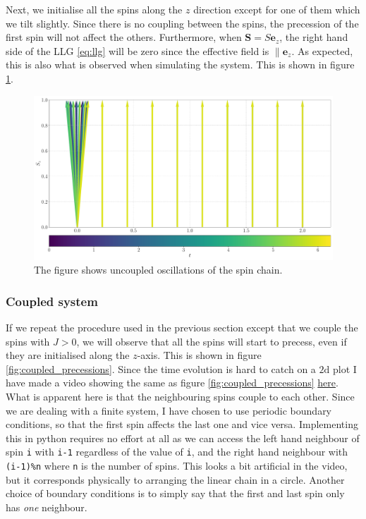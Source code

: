 Next, we initialise all the spins along the $z$ direction except for one of them which we tilt slightly. Since there is no coupling between the spins, the precession of the first spin will not affect the others. Furthermore, when $\mathbf{S} = S\mathbf{e}_z$, the right hand side of the LLG \eqref{eq:llg} will be zero since the effective field is $\parallel \mathbf{e}_z$. As expected, this is also what is observed when simulating the system. This is shown in figure \ref{fig:precessions}.

\begin{figure}[htb]
	\centering
	\includegraphics[width=\columnwidth]{../fig/10_precessions.pdf}
	\caption{The figure shows uncoupled oscillations of the spin chain.}
	\label{fig:precessions}
\end{figure}

\subsubsection{Coupled system}

If we repeat the procedure used in the previous section except that we couple the spins with $J > 0$, we will observe that all the spins will start to precess, even if they are initialised along the $z$-axis. This is shown in figure \ref{fig:coupled_precessions}. Since the time evolution is hard to catch on a $2\mathrm{d}$ plot I have made a video showing the same as figure \ref{fig:coupled_precessions} \href{https://folk.ntnu.no/sondrdl/spinwaves/coupled.mp4}{here}. What is apparent here is that the neighbouring spins couple to each other. Since we are dealing with a finite system, I have chosen to use periodic boundary conditions, so that the first spin affects the last one and vice versa. Implementing this in python requires no effort at all as we can access the left hand neighbour of spin \texttt{i} with \texttt{i-1} regardless of the value of \texttt{i}, and the right hand neighbour with \texttt{(i-1)\%n} where \texttt{n} is the number of spins. This looks a bit artificial in the video, but it corresponds physically to arranging the linear chain in a circle. Another choice of boundary conditions is to simply say that the first and last spin only has \textit{one} neighbour. 

